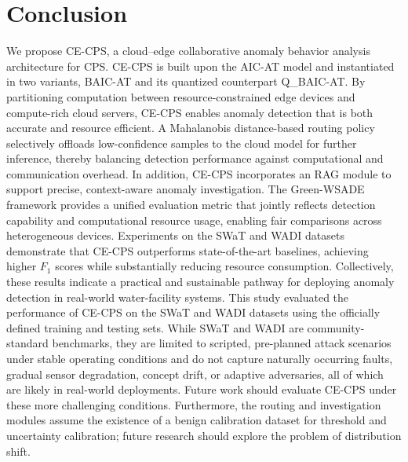 \documentclass[pdflatex,sn-mathphys-num]{sn-jnl}%
\theoremstyle{thmstyleone}
\theoremstyle{thmstyletwo}%
\theoremstyle{thmstylethree}%
\begin{document}
\section{Conclusion}\label{sec: conclusion}
We propose CE-CPS, a cloud--edge collaborative anomaly behavior analysis architecture for CPS. CE-CPS is built upon the AIC-AT model and instantiated in two variants, BAIC-AT and its quantized counterpart Q\_BAIC-AT. By partitioning computation between resource-constrained edge devices and compute-rich cloud servers, CE-CPS enables anomaly detection that is both accurate and resource efficient. A Mahalanobis distance-based routing policy selectively offloads low-confidence samples to the cloud model for further inference, thereby balancing detection performance against computational and communication overhead. In addition, CE-CPS incorporates an RAG module to support precise, context-aware anomaly investigation.
The Green-WSADE framework provides a unified evaluation metric that jointly reflects detection capability and computational resource usage, enabling fair comparisons across heterogeneous devices. Experiments on the SWaT and WADI datasets demonstrate that CE-CPS outperforms state-of-the-art baselines, achieving higher $F_1$ scores while substantially reducing resource consumption. Collectively, these results indicate a practical and sustainable pathway for deploying anomaly detection in real-world water-facility systems.
This study evaluated the performance of CE-CPS on the SWaT and WADI datasets using the officially defined training and testing sets. While SWaT and WADI are community-standard benchmarks, they are limited to scripted, pre-planned attack scenarios under stable operating conditions and do not capture naturally occurring faults, gradual sensor degradation, concept drift, or adaptive adversaries, all of which are likely in real-world deployments. Future work should evaluate CE-CPS under these more challenging conditions. Furthermore, the routing and investigation modules assume the existence of a benign calibration dataset for threshold and uncertainty calibration; future research should explore the problem of distribution shift.



\end{document}
